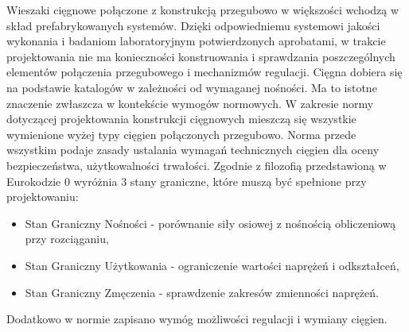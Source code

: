 Wieszaki cięgnowe połączone z konstrukcją przegubowo w większości wchodzą w skład prefabrykowanych systemów. Dzięki odpowiedniemu systemowi jakości wykonania i badaniom laboratoryjnym potwierdzonych aprobatami, w trakcie projektowania nie ma konieczności konstruowania i sprawdzania poszczególnych elementów połączenia przegubowego i mechanizmów regulacji. Cięgna dobiera się na podstawie katalogów w zależności od wymaganej nośności. Ma to istotne znaczenie zwłaszcza w kontekście wymogów normowych. W zakresie normy \parencite{PN-EN-1993-1-112008} dotyczącej projektowania konstrukcji cięgnowych mieszczą się wszystkie wymienione wyżej typy cięgien połączonych przegubowo. Norma przede wszystkim podaje zasady ustalania wymagań technicznych cięgien dla oceny bezpieczeństwa, użytkowalności trwałości. Zgodnie z filozofią przedstawioną w Eurokodzie 0 wyróżnia 3 stany graniczne, które muszą być spełnione przy projektowaniu:
\begin{itemize}[noitemsep]
	\item Stan Graniczny Nośności  - porównanie siły osiowej z nośnością obliczeniową przy rozciąganiu,
	\item Stan Graniczny Użytkowania  - ograniczenie wartości naprężeń i odkształceń,
	\item Stan Graniczny Zmęczenia  - sprawdzenie zakresów zmienności naprężeń.
\end{itemize}
Dodatkowo w normie zapisano wymóg możliwości regulacji i wymiany cięgien. 




